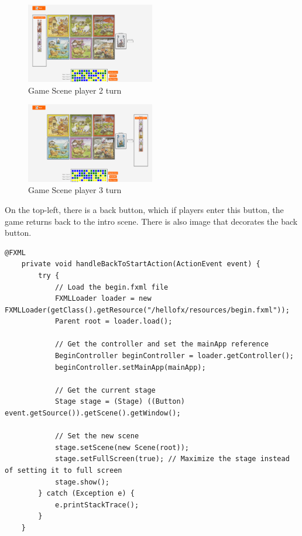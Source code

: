 \documentclass[conference]{IEEEtran}
\begin{document}
\begin{figure}[h!]
    \centering
    \includegraphics[width=0.5\textwidth]{img/Screenshot 2025-01-14 120420.png} %
    \caption{Game Scene player 2 turn}
    \label{fig:game-scene}
\end{figure} 

\begin{figure}[h!]
    \centering
    \includegraphics[width=0.5\textwidth]{img/Screenshot 2025-01-14 120632.png} %
    \caption{Game Scene player 3 turn}
    \label{fig:game-scene}
\end{figure} 

\vspace{2cm}

On the top-left, there is a back button, which if players enter this button, the game returns back to the intro scene. There is also image that decorates the back button.

\begin{lstlisting}[language = FXMl, caption = Back Button,basicstyle=\scriptsize, frame=single, framesep=1pt, framerule=0.5pt, xleftmargin=8pt, xrightmargin=8pt]
    @FXML
    private void handleBackToStartAction(ActionEvent event) {
        try {
            // Load the begin.fxml file
            FXMLLoader loader = new FXMLLoader(getClass().getResource("/hellofx/resources/begin.fxml"));
            Parent root = loader.load();

            // Get the controller and set the mainApp reference
            BeginController beginController = loader.getController();
            beginController.setMainApp(mainApp);

            // Get the current stage
            Stage stage = (Stage) ((Button) event.getSource()).getScene().getWindow();

            // Set the new scene
            stage.setScene(new Scene(root));
            stage.setFullScreen(true); // Maximize the stage instead of setting it to full screen
            stage.show();
        } catch (Exception e) {
            e.printStackTrace();
        }
    }
    
\end{lstlisting}
\end{document}
